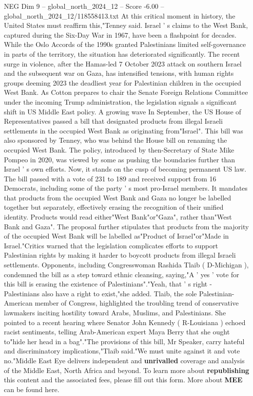 \begin{textsample}{NEG Dim 9 – global\_north\_2024\_12 – Score -6.00 – global\_north\_2024\_12/118558413.txt}
At this critical moment in history, the United States must reaffirm this,"Tenney said.
Israel ' s claims to the West Bank, captured during the Six-Day War in 1967, have been a flashpoint for decades.
While the Oslo Accords of the 1990s granted Palestinians limited self-governance in parts of the territory, the situation has deteriorated significantly.
The recent surge in violence, after the Hamas-led 7 October 2023 attack on southern Israel and the subsequent war on Gaza, has intensified tensions, with human rights groups deeming 2023 the deadliest year for Palestinian children in the occupied West Bank.
As Cotton prepares to chair the Senate Foreign Relations Committee under the incoming Trump administration, the legislation signals a significant shift in US Middle East policy.
A growing wave In September, the US House of Representatives passed a bill that designated products from illegal Israeli settlements in the occupied West Bank as originating from"Israel".
This bill was also sponsored by Tenney, who was behind the House bill on renaming the occupied West Bank.
The policy, introduced by then-Secretary of State Mike Pompeo in 2020, was viewed by some as pushing the boundaries further than Israel ' s own efforts.
Now, it stands on the cusp of becoming permanent US law.
The bill passed with a vote of 231 to 189 and received support from 16 Democrats, including some of the party ' s most pro-Israel members.
It mandates that products from the occupied West Bank and Gaza no longer be labelled together but separately, effectively erasing the recognition of their unified identity.
Products would read either"West Bank"or"Gaza", rather than"West Bank and Gaza".
The proposal further stipulates that products from the majority of the occupied West Bank will be labelled as"Product of Israel"or"Made in Israel."Critics warned that the legislation complicates efforts to support Palestinian rights by making it harder to boycott products from illegal Israeli settlements.
Opponents, including Congresswoman Rashida Tlaib ( D-Michigan ), condemned the bill as a step toward ethnic cleansing, saying,"A ' yes ' vote for this bill is erasing the existence of Palestinians"."Yeah, that ' s right - Palestinians also have a right to exist,"she added.
Tlaib, the sole Palestinian-American member of Congress, highlighted the troubling trend of conservative lawmakers inciting hostility toward Arabs, Muslims, and Palestinians.
She pointed to a recent hearing where Senator John Kennedy ( R-Louisiana ) echoed racist sentiments, telling Arab-American expert Maya Berry that she ought to"hide her head in a bag"."The provisions of this bill, Mr Speaker, carry hateful and discriminatory implications,"Tlaib said."We must unite against it and vote no."Middle East Eye delivers independent and \textbf{unrivalled} coverage and analysis of the Middle East, North Africa and beyond.
To learn more about \textbf{republishing} this content and the associated fees, please fill out this form.
More about \textbf{MEE} can be found here.

\end{textsample}
